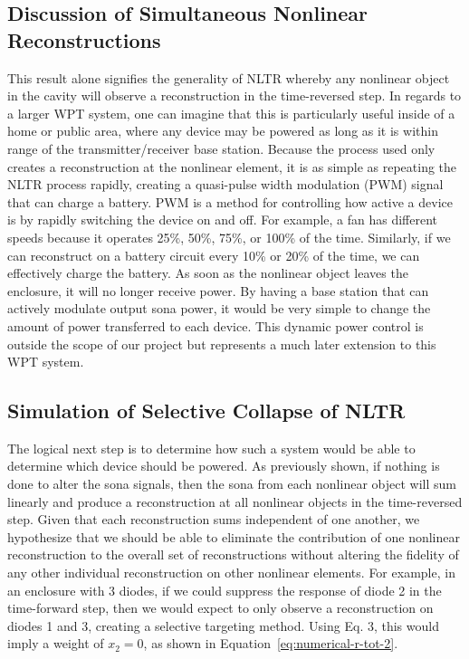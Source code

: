 \subsection{Discussion of Simultaneous Nonlinear Reconstructions}

This result alone signifies the generality of NLTR whereby any nonlinear object in the cavity will observe a reconstruction in the time-reversed step. In regards to a larger WPT system, one can imagine that this is particularly useful inside of a home or public area, where any device may be powered as long as it is within range of the transmitter/receiver base station. Because the process used only creates a reconstruction at the nonlinear element, it is as simple as repeating the NLTR process rapidly, creating a quasi-pulse width modulation (PWM) signal that can charge a battery. PWM is a method for controlling how active a device is by rapidly switching the device on and off. For example, a fan has different speeds because it operates 25\%, 50\%, 75\%, or 100\% of the time. Similarly, if we can reconstruct on a battery circuit every 10\% or 20\% of the time, we can effectively charge the battery. As soon as the nonlinear object leaves the enclosure, it will no longer receive power. By having a base station that can actively modulate output sona power, it would be very simple to change the amount of power transferred to each device. This dynamic power control is outside the scope of our project but represents a much later extension to this WPT system.

\subsection{Simulation of Selective Collapse of NLTR}
\label{sec:selective-sim}
The logical next step is to determine how such a system would be able to determine which device should be powered. As previously shown, if nothing is done to alter the sona signals, then the sona from each nonlinear object will sum linearly and produce a reconstruction at all nonlinear objects in the time-reversed step. Given that each reconstruction sums independent of one another, we hypothesize that we should be able to eliminate the contribution of one nonlinear reconstruction to the overall set of reconstructions without altering the fidelity of any other individual reconstruction on other nonlinear elements. For example, in an enclosure with 3 diodes, if we could suppress the response of diode 2 in the time-forward step, then we would expect to only observe a reconstruction on diodes 1 and 3, creating a selective targeting method. Using Eq. 3, this would imply a weight of $x_{2} = 0$, as shown in Equation~\ref{eq:numerical-r-tot-2}.

